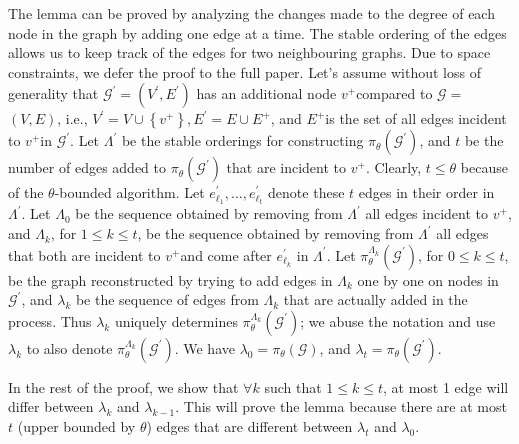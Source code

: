 \ifpaper
The lemma can be proved by analyzing the changes made to the degree of each node in the graph by adding one edge at a time. The stable ordering of the edges allows us to keep track of the edges for two neighbouring graphs. Due to space constraints, we defer the proof to the full paper.  
\else
\proof
Let's assume without loss of generality that
$\mathcal{G}^{\prime}=\left(V^{\prime}, E^{\prime}\right)$ has an additional node $v^{+}$compared to $\mathcal{G}=$ $(V, E)$, i.e., $V^{\prime}=V \cup\left\{v^{+}\right\}, E^{\prime}=E \cup E^{+}$, and $E^{+}$is the set of all edges incident to $v^{+}$in $\mathcal{G}^{\prime}$. Let $\Lambda^{\prime}$ be the stable orderings for constructing $\pi_\theta\left(\mathcal{G}^{\prime}\right)$, and $t$ be the number of edges added to $\pi_\theta\left(\mathcal{G}^{\prime}\right)$ that are incident to $v^{+}$. Clearly, $t \leq \theta$ because of the $\theta$-bounded algorithm. Let $e_{\ell_1}^{\prime}, \ldots, e_{\ell_t}^{\prime}$ denote these $t$ edges in their order in $\Lambda^{\prime}$. Let $\Lambda_0$ be the sequence obtained by removing from $\Lambda^{\prime}$ all edges incident to $v^{+}$, and $\Lambda_k$, for $1 \leq k \leq t$, be the sequence obtained by removing from $\Lambda^{\prime}$ all edges that both are incident to $v^{+}$and come after $e_{\ell_k}^{\prime}$ in $\Lambda^{\prime}$. Let $\pi_\theta^{\Lambda_k}\left(\mathcal{G}^{\prime}\right)$, for $0 \leq k \leq t$, be the graph reconstructed by trying to add edges in $\Lambda_k$ one by one on nodes in $\mathcal{G}^{\prime}$, and $\lambda_k$ be the sequence of edges from $\Lambda_k$ that are actually added in the process. Thus $\lambda_k$ uniquely determines $\pi_\theta^{\Lambda_k}\left(\mathcal{G}^{\prime}\right)$; we abuse the notation and use $\lambda_k$ to also denote $\pi_\theta^{\Lambda_k}\left(\mathcal{G}^{\prime}\right)$. We have $\lambda_0=\pi_\theta(\mathcal{G})$, and $\lambda_t=\pi_\theta\left(\mathcal{G}^{\prime}\right)$.

In the rest of the proof, we show that $\forall k$ such that $1 \leq k \leq t$, at most 1 edge will differ between $\lambda_k$ and $\lambda_{k-1}$. This will prove the lemma because there are at most $t$ (upper bounded by $\theta$) edges that are different between $\lambda_t$ and $\lambda_0$.

